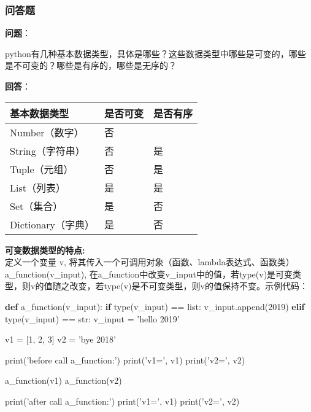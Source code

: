 \documentclass[11pt]{article}
\newenvironment{Shaded}{}{}
\newcommand{\KeywordTok}[1]{\textcolor[rgb]{0.00,0.44,0.13}{\textbf{{#1}}}}
\newcommand{\DecValTok}[1]{\textcolor[rgb]{0.25,0.63,0.44}{{#1}}}
\newcommand{\StringTok}[1]{\textcolor[rgb]{0.25,0.44,0.63}{{#1}}}
\newcommand{\NormalTok}[1]{{#1}}
\newcommand{\ControlFlowTok}[1]{\textcolor[rgb]{0.00,0.44,0.13}{\textbf{{#1}}}}
\newcommand{\OperatorTok}[1]{\textcolor[rgb]{0.40,0.40,0.40}{{#1}}}
\newcommand{\BuiltInTok}[1]{{#1}}
\begin{document}
\subsubsection{问答题}\label{ux95eeux7b54ux9898}

\textbf{问题}：

python有几种基本数据类型，具体是哪些？这些数据类型中哪些是可变的，哪些是不可变的？哪些是有序的，哪些是无序的？

    \textbf{回答}：

\begin{longtable}[]{@{}lll@{}}
\toprule
基本数据类型 & 是否可变 & 是否有序\tabularnewline
\midrule
\endhead
Number（数字） & 否 &\tabularnewline
String（字符串） & 否 & 是\tabularnewline
Tuple（元组） & 否 & 是\tabularnewline
List（列表） & 是 & 是\tabularnewline
Set（集合） & 是 & 否\tabularnewline
Dictionary（字典） & 是 & 否\tabularnewline
\bottomrule
\end{longtable}

\textbf{可变数据类型的特点:}\\
定义一个变量 v,
将其传入一个可调用对象（函数、lambda表达式、函数类）a\_function(v\_input),
在a\_function中改变v\_input中的值，若type(v)是可变类型，则v的值随之改变，若type(v)是不可变类型，则v的值保持不变。示例代码：

\begin{Shaded}
\begin{Highlighting}[]
\KeywordTok{def}\NormalTok{ a_function(v_input):}
    \ControlFlowTok{if} \BuiltInTok{type}\NormalTok{(v_input) }\OperatorTok{==} \BuiltInTok{list}\NormalTok{:}
\NormalTok{        v_input.append(}\DecValTok{2019}\NormalTok{)}
    \ControlFlowTok{elif} \BuiltInTok{type}\NormalTok{(v_input) }\OperatorTok{==} \BuiltInTok{str}\NormalTok{:}
\NormalTok{        v_input }\OperatorTok{=} \StringTok{'hello 2019'}

\NormalTok{v1 }\OperatorTok{=}\NormalTok{ [}\DecValTok{1}\NormalTok{, }\DecValTok{2}\NormalTok{, }\DecValTok{3}\NormalTok{]}
\NormalTok{v2 }\OperatorTok{=} \StringTok{'bye 2018'}

\BuiltInTok{print}\NormalTok{(}\StringTok{'before call a_function:'}\NormalTok{)}
\BuiltInTok{print}\NormalTok{(}\StringTok{'v1='}\NormalTok{, v1)}
\BuiltInTok{print}\NormalTok{(}\StringTok{'v2='}\NormalTok{, v2)}

\NormalTok{a_function(v1)}
\NormalTok{a_function(v2)}

\BuiltInTok{print}\NormalTok{(}\StringTok{'after call a_function:'}\NormalTok{)}
\BuiltInTok{print}\NormalTok{(}\StringTok{'v1='}\NormalTok{, v1)}
\BuiltInTok{print}\NormalTok{(}\StringTok{'v2='}\NormalTok{, v2)}
\end{Highlighting}
\end{Shaded}
\end{document}
